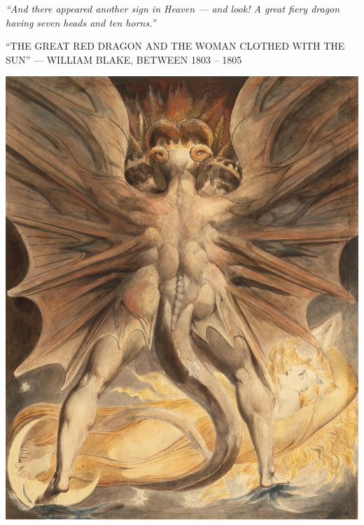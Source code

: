 \clearpage
\thispagestyle{empty}
\null\vfill
\settowidth{}
\begin{center}
\parbox{\longest}{%
  \raggedright{\huge\itshape%
    ``And there appeared another sign in Heaven — and look! A great fiery dragon having seven heads and ten horns.'' \par\bigskip
  }
  \raggedleft\Large\MakeUppercase{``The Great Red Dragon and the Woman Clothed with the Sun'' — William Blake, between 1803 – 1805}\par%
}
\vfill\vfill
\clearpage\newpage
\end{center}
\newpage
\thispagestyle{empty}
\begin{center}
	\includegraphics[width=1\textwidth]{images/illustrations/blakedragonwoman}
\end{center}